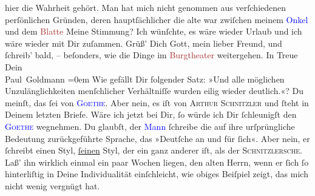                hier die Wahrheit gehört. Man hat mich nicht genommen aus verſchiedenen {\pb}perſönlichen Gründen, deren hauptſächlicher die alte
                  \label{K_L02748-111v}\label{K_L02748-111h} war zwiſchen meinem \textcolor{blue}{Onkel}{} und dem \textcolor{brown}{Blatte}{}\pend
           \pstart
           Meine Stimmung? Ich wünſchte, es wäre wieder Urlaub und ich wäre wieder mit Dir
               zuſammen.\pend
           \pstart
           Grüß’ Dich Gott, mein lieber Freund, und ſchreib’ bald, – beſonders, wie die Dinge im
                  \textcolor{brown}{Burgtheater}{}\ledrightnote{\textcolor{brown}{Burgtheater}} weitergehen.\pend
           \pstart
           In Treue {\\[\baselineskip]}Dein {\\[\baselineskip]}\spacefill\mbox{Paul Goldmann}\pend
           \leftskip=0em{}\pstart
           \noindent{}Wie gefällt Dir folgender Satz: »Und alle möglichen Unzulänglichkeiten
                  menſchlicher Verhältniſſe wurden eilig wieder deutlich.«? Du meinſt, das ſei von
                     \textsc{\textcolor{blue}{Goethe}{}\ledrightnote{\textcolor{blue}{Johann Wolfgang von Goethe}}}. Aber nein, es iſt von \textsc{Arthur Schnitzler} und ſteht
                  in Deinem letzten Briefe. Wäre ich jetzt bei Dir, ſo würde ich Dir ſchleunigſt den
                     \textsc{\textcolor{blue}{Goethe}{}\ledrightnote{\textcolor{blue}{Johann Wolfgang von Goethe}}} wegnehmen. Du glaubſt, der \textcolor{blue}{Mann}{} ſchreibe  die auf ihre urſprüngliche Bedeutung zurückgeführte Sprache, das »Deutſche
                  an {\pb}und für ſich«. Aber nein, er ſchreibt einen
                  Styl, \uline{ſeinen} Styl, der ein ganz anderer iſt, als
                  der \textsc{Schnitzlersche}. Laß’ ihn wirklich einmal ein paar
                  Wochen liegen, den alten Herrn, wenn er ſich ſo hinterliſtig in Deine
                  Individualität einſchleicht, wie obiges Beiſpiel zeigt, das mich nicht wenig
                  vergnügt hat.\pend
           \endnumbering{}  
      